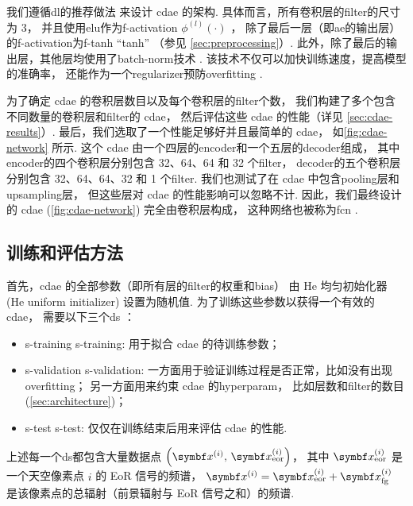 我们遵循\ac{dl}的推荐做法\cite{geron2017,suganuma2018} 来设计 \ac{cdae} 的架构.
具体而言，所有卷积层的\ac{filter}的尺寸为 3，
并且使用\ac{elu}作为\ac{f-activation} $\phi^{(l)}(\cdot)$ \cite{clevert2016}，
除了最后一层（即\ac{ae}的输出层）的\ac{f-activation}为\ac{f-tanh} \enquote{tanh}
（参见 \autoref{sec:preprocessing}）.
此外，除了最后的输出层，其他层均使用了\ac{batch-norm}技术 \cite{ioffe2015}.
该技术不仅可以加快训练速度，提高模型的准确率，
还能作为一个\ac{regularizer}预防\ac{overfitting} \cite{geron2017}.

为了确定 \ac{cdae} 的卷积层数目以及每个卷积层的\ac{filter}个数，
我们构建了多个包含不同数量的卷积层和\ac{filter}的 \ac{cdae}，
然后评估这些 \ac{cdae} 的性能（详见 \autoref{sec:cdae-results}）.
最后，我们选取了一个性能足够好并且最简单的 \ac{cdae}，
如\autoref{fig:cdae-network} 所示.
这个 \ac{cdae} 由一个四层的\ac{encoder}和一个五层的\ac{decoder}组成，
其中\ac{encoder}的四个卷积层分别包含 32、64、64 和 32 个\ac{filter}，
\ac{decoder}的五个卷积层分别包含 32、64、64、32 和 1 个\ac{filter}.
我们也测试了在 \ac{cdae} 中包含\ac{pooling}层和\ac{upsampling}层，
但这些层对 \ac{cdae} 的性能影响可以忽略不计.
因此，我们最终设计的 \ac{cdae} (\autoref{fig:cdae-network}) 完全由卷积层构成，
这种网络也被称为\ac{fcn} \cite{long2015,springenberg2015}.

\subsection{训练和评估方法}
\label{sec:train-eval}

首先，\ac{cdae} 的全部参数（即所有层的\ac{filter}的权重和\ac{bias}）
由 He 均匀初始化器 (He uniform initializer)\cite{he2015} 设置为随机值.
为了训练这些参数以获得一个有效的 \ac{cdae}，
需要以下三个\ac{ds} \cite{ripley1996}：
\begin{itemize}
  \item \acl{s-training} \ac{s-training}:
    用于拟合 \ac{cdae} 的待训练参数；
  \item \acl{s-validation} \ac{s-validation}:
    一方面用于验证训练过程是否正常，比如没有出现\ac{overfitting}；
    另一方面用来约束 \ac{cdae} 的\ac{hyperparam}，
    比如层数和\ac{filter}的数目 (\autoref{sec:architecture})；
  \item \acl{s-test} \ac{s-test}:
    仅仅在训练结束后用来评估 \ac{cdae} 的性能.
\end{itemize}
上述每一个\ac{ds}都包含大量数据点
$\left( \B{x}^{(i)}, \,\B{x}^{(i)}_{\R{eor}} \right)$，
其中 $\B{x}^{(i)}_{\R{eor}}$ 是一个天空像素点 $i$ 的 EoR 信号的频谱，
$\B{x}^{(i)} = \B{x}^{(i)}_{\R{eor}} + \B{x}^{(i)}_{\R{fg}}$
是该像素点的总辐射（前景辐射与 EoR 信号之和）的频谱.

